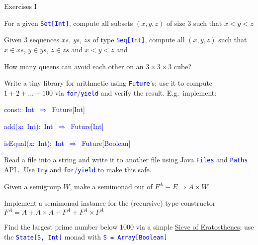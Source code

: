 \documentclass[english]{beamer}
\newenvironment{lyxcode}
   {\par\begin{list}{}{
     \setlength{\rightmargin}{\leftmargin}
     \setlength{\listparindent}{0pt}%
     \raggedright
     \setlength{\itemsep}{0pt}
     \setlength{\parsep}{0pt}
     \normalfont\ttfamily}%
    \def\{{\char`\{}
    \def\}{\char`\}}
    \def\textasciitilde{\char`\~}
    \item[]}
   {\end{list}}
\begin{document}
\begin{frame}{Exercises I}
\begin{enumerate}
\item For a given \texttt{\textcolor{blue}{\footnotesize{}Set{[}Int{]}}},
compute all subsets $\left(x,y,z\right)$ of size 3 such that $x<y<z$
\item Given 3 sequences $xs$, $ys$, $zs$ of type \texttt{\textcolor{blue}{\footnotesize{}Seq{[}Int{]}}},
compute all $\left(x,y,z\right)$ such that $x\in xs$, $y\in ys$,
$z\in zs$ and $x<y<z$ and 
\item How many queens can avoid each other on an $3\times3\times3$ cube?
\item Write a tiny library for arithmetic using \texttt{\textcolor{blue}{\footnotesize{}Future}}'s;
use it to compute $1+2+...+100$ via \texttt{\textcolor{blue}{\footnotesize{}for}}/\texttt{\textcolor{blue}{\footnotesize{}yield}}
and verify the result. E.g.\ implement: 
\begin{lyxcode}
\textcolor{blue}{\footnotesize{}const:~Int~$\Rightarrow$~Future{[}Int{]}}{\footnotesize \par}

\textcolor{blue}{\footnotesize{}add(x:~Int):~Int~$\Rightarrow$~Future{[}Int{]}}{\footnotesize \par}

\textcolor{blue}{\footnotesize{}isEqual(x:~Int):~Int~$\Rightarrow$~Future{[}Boolean{]}~}{\footnotesize \par}
\end{lyxcode}
\item Read a file into a string and write it to another file using Java
\texttt{\textcolor{blue}{\footnotesize{}Files}} and \texttt{\textcolor{blue}{\footnotesize{}Paths}}
API\texttt{\textcolor{blue}{\footnotesize{}. }}Use \texttt{\textcolor{blue}{\footnotesize{}Try}}
and \texttt{\textcolor{blue}{\footnotesize{}for}}/\texttt{\textcolor{blue}{\footnotesize{}yield}}
to make this safe.
\item Given a semigroup $W$, make a semimonad out of $F^{A}\equiv E\Rightarrow A\times W$ 
\item Implement a semimonad instance for the (recursive) type constructor
$F^{A}=A+A\times A+F^{A}+F^{A}\times F^{A}$
\item Find the largest prime number below 1000 via a simple \href{https://en.wikipedia.org/wiki/Sieve_of_Eratosthenes}{Sieve of Eratosthenes};
use the \texttt{\textcolor{blue}{\footnotesize{}State{[}S, Int{]}}}
monad with \texttt{\textcolor{blue}{\footnotesize{}S = Array{[}Boolean{]}}} 
\end{enumerate}
\end{frame}
\end{document}

